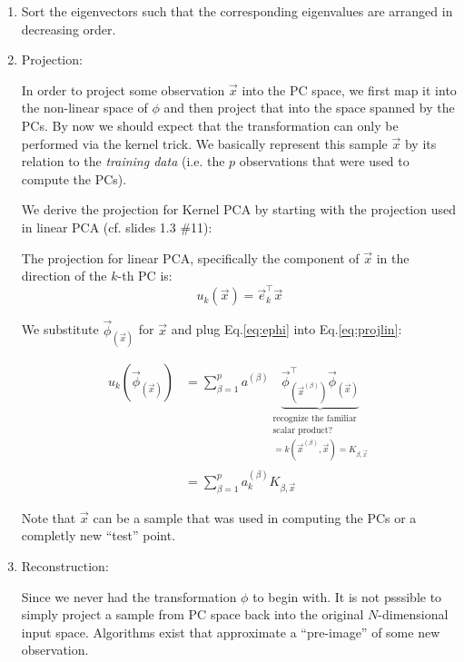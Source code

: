 \begin{enumerate}
\newpage

\item Sort the eigenvectors such that the corresponding eigenvalues are arranged in decreasing order. 


\item Projection:

In order to project some observation $\vec x$ into the PC space, we first map it into the non-linear space of $\phi$ 
and then project that into the space spanned by the PCs. 
By now we should expect that the transformation can only be performed via the kernel trick. 
We basically represent this sample $\vec x$ by its relation to the \emph{training data} 
(i.e. the $p$ observations that were used to compute the PCs).

We derive the projection for Kernel PCA by starting with the projection used in linear PCA (cf. slides 1.3 \#11):

The projection for linear PCA, specifically the component of $\vec x$ in the direction of the $k$-th PC is:
\begin{equation}
\label{eq:projlin}
u_k(\vec x) = \vec e_k^\top \vec x
\end{equation}

We substitute $\vec \phi_{(\vec x)}$ for $\vec x$ and plug Eq.\ref{eq:ephi} into Eq.\ref{eq:projlin}:

\begin{align}
\label{eq:projk1}
u_k(\vec \phi_{(\vec x)}) &= \sum^{p}_{\beta=1} a^{(\beta)} 
\underbrace{
\vec{\phi}^\top_{(\vec{x}^{(\beta)})} \vec \phi_{(\vec x)}
}_{\substack{
\text{recognize the familiar}\\
\text{scalar product?}
\\ =k(\vec x^{(\beta)}, \vec x) = K_{\beta,\vec x}}}\\
&= \sum_{\beta=1}^{p} a_k^{(\beta)} K_{\beta, \vec x}
\end{align}

Note that $\vec x$ can be a sample that was used in computing the PCs or a completly new ``test'' point.

\item Reconstruction:

Since we never had the transformation $\phi$ to begin with. 
It is not psssible to simply project a sample from PC space back into the original $N$-dimensional input space. 
Algorithms exist that approximate a ``pre-image'' of some new observation.
\end{enumerate}
